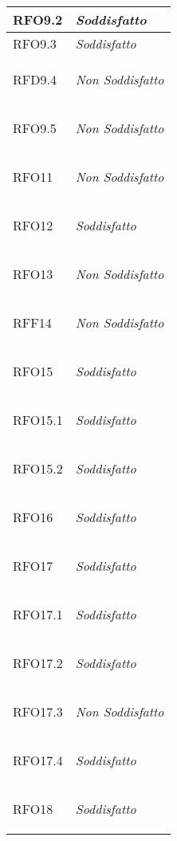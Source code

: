 \begin{longtable}{|>{\centering}m{5cm}|m{5cm}<{\centering}|}
    \hypertarget{RFO9.2}{RFO9.2} & \textit{Soddisfatto}\\ \hline
   
    \hypertarget{RFO9.3}{RFO9.3} & \textit{Soddisfatto}\\ \hline
   
    \hypertarget{RFD9.4}{RFD9.4} & \textit{Non Soddisfatto}\\ \hline
   
    \hypertarget{RFO9.5}{RFO9.5} & \textit{Non Soddisfatto}\\ \hline
   
    \hypertarget{RFO11}{RFO11} & \textit{Non Soddisfatto}\\ \hline
   
    \hypertarget{RFO12}{RFO12} & \textit{Soddisfatto}\\ \hline
   
    \hypertarget{RFO13}{RFO13} & \textit{Non Soddisfatto}\\ \hline
   
    \hypertarget{RFF14}{RFF14} & \textit{Non Soddisfatto}\\ \hline
   
    \hypertarget{RFO15}{RFO15} & \textit{Soddisfatto}\\ \hline
   
    \hypertarget{RFO15.1}{RFO15.1} & \textit{Soddisfatto}\\ \hline
   
    \hypertarget{RFO15.2}{RFO15.2} & \textit{Soddisfatto}\\ \hline
   
    \hypertarget{RFO16}{RFO16} & \textit{Soddisfatto}\\ \hline
   
    \hypertarget{RFO17}{RFO17} & \textit{Soddisfatto}\\ \hline
   
    \hypertarget{RFO17.1}{RFO17.1} & \textit{Soddisfatto}\\ \hline
   
    \hypertarget{RFO17.2}{RFO17.2} & \textit{Soddisfatto}\\ \hline
   
    \hypertarget{RFO17.3}{RFO17.3} & \textit{Non Soddisfatto}\\ \hline
   
    \hypertarget{RFO17.4}{RFO17.4} & \textit{Soddisfatto}\\ \hline
   
    \hypertarget{RFO18}{RFO18} & \textit{Soddisfatto}\\ \hline
   

\end{longtable}
